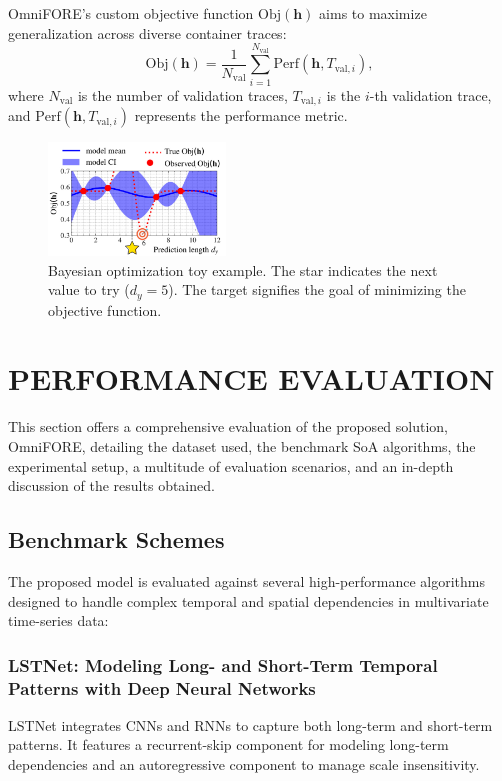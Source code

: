 \documentclass{ieeetmlcn}
\begin{document}
OmniFORE's custom objective function $\text{Obj}(\mathbf{h})$ aims to maximize generalization across diverse container traces:
\begin{equation}
    \text{Obj}(\mathbf{h}) = \frac{1}{N_{\text{val}}} \sum_{i=1}^{N_{\text{val}}} \text{Perf}(\mathbf{h}, T_{\text{val}, i}),
\end{equation}
where $N_{\text{val}}$ is the number of validation traces, $T_{\text{val}, i}$ is the $i$-th validation trace, and $\text{Perf}(\mathbf{h}, T_{\text{val}, i})$ represents the performance metric.

\begin{figure}\centering
\centering
\includegraphics[width=0.42\textwidth]{img/gp_toy_example.pdf}
\caption{Bayesian optimization toy example. The star indicates the next value to try ($d_y = 5$). The target signifies the goal of minimizing the objective function.}
\label{fig:gp_toy_example}
\end{figure}

\section{PERFORMANCE EVALUATION}
\label{sec: Performance Evaluation}

This section offers a comprehensive evaluation of the proposed solution, OmniFORE, detailing the dataset used, the benchmark SoA algorithms, the experimental setup, a multitude of evaluation scenarios, and an in-depth discussion of the results obtained.

\subsection{Benchmark Schemes}

The proposed model is evaluated against several high-performance algorithms designed to handle complex temporal and spatial dependencies in multivariate time-series data:

\subsubsection*{\textbf{LSTNet: Modeling Long- and Short-Term Temporal Patterns with Deep Neural Networks \cite{LSTNet}}}
LSTNet integrates CNNs and RNNs to capture both long-term and short-term patterns. It features a recurrent-skip component for modeling long-term dependencies and an autoregressive component to manage scale insensitivity.
\end{document}
